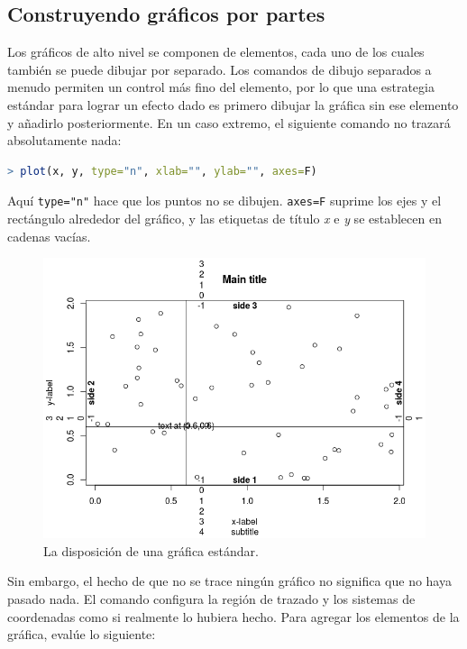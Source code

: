 \subsection{Construyendo gráficos por partes}

Los gráficos de alto nivel se componen de elementos, cada uno de los cuales
también se puede dibujar por separado. Los comandos de dibujo separados a menudo
permiten un control más fino del elemento, por lo que una estrategia estándar
para lograr un efecto dado es primero dibujar la gráfica sin ese elemento y
añadirlo posteriormente. En un caso extremo, el siguiente comando no trazará
absolutamente nada:

\begin{lstlisting}[language=R]
> plot(x, y, type="n", xlab="", ylab="", axes=F)
\end{lstlisting}

Aquí \texttt{type="n"} hace que los puntos no se dibujen. \texttt{axes=F}
suprime los ejes y el rectángulo alrededor del gráfico, y las etiquetas de
título \textit{x} e \textit{y} se establecen en cadenas vacías.

\begin{figure}[H]
  \includegraphics[width=\linewidth]{fig-5.png}
  \caption{La disposición de una gráfica estándar.}
  \label{fig:fig-5}
\end{figure}

Sin embargo, el hecho de que no se trace ningún gráfico no significa que no haya
pasado nada. El comando configura la región de trazado y los sistemas de
coordenadas como si realmente lo hubiera hecho. Para agregar los elementos de la
gráfica, evalúe lo siguiente:

